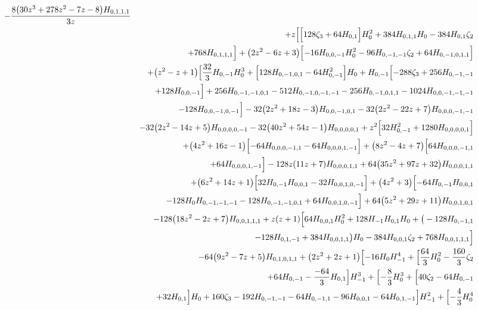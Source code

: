 \begin{eqnarray}
-\frac{8 \big(30 z^3+278  z^2-7 z-8\big) H_{0,1,1,1}}{3 z}
\nonumber \\ &&
+z \Bigl[\Bigl[128  \zeta_3+64 H_{0,1}\Bigr] H_0^2+384  H_{0,1,1} H_0-384  H_{0,1}\zeta_2
\nonumber \\ &&
+768  H_{0,1,1,1}\Bigr]+\big(2 z^2-6 z+3\big) \Bigl[-16H_{0,0,-1} H_0^2-96 H_{0,-1,-1} \zeta_2+64 H_{0,-1,0,1,1}\Bigr]
\nonumber \\ &&
+\big(z^2-z+1\big) \Bigl[\frac{32}{3} H_{0,-1}H_0^3+\Bigl[128  H_{0,-1,0,1}-64 H_{0,-1}^2\Bigr] H_0+H_{0,-1} \Bigl[-288 \zeta_3
+256 H_{0,-1,-1}
\nonumber \\ &&
+128 H_{0,0,-1}\Bigr]+256 H_{0,-1,-1,0,1}-512 H_{0,-1,0,-1,-1}-256 H_{0,-1,0,1,1}-1024H_{0,0,-1,-1,-1}
\nonumber \\ &&
-128 H_{0,0,-1,0,-1}\Bigr]-32 \big(2 z^2+18 z-3\big)H_{0,0,-1,0,1}-32 \big(2 z^2-22 z+7\big) H_{0,0,0,-1,-1}
\nonumber \\ &&
-32 \big(2 z^2-14z+5\big) H_{0,0,0,0,-1}-32 \big(40 z^2+54 z-1\big) H_{0,0,0,0,1}+z^2 \Bigl[32H_{0,-1}^2+1280  H_{0,0,0,0,1}\Bigr]
\nonumber \\ &&
+\big(4 z^2+16 z-1\big) \Bigl[-64H_{0,0,0,-1,1}-64 H_{0,0,0,1,-1}\Bigr]+\big(8 z^2-4 z+7\big) \Bigl[64 H_{0,0,0,-1,1}
\nonumber \\ &&
+64  H_{0,0,0,1,-1}\Bigr]-128  z (11 z+7)H_{0,0,0,1,1}+64 \big(35 z^2+97 z+32\big) H_{0,0,0,1,1}
\nonumber \\ &&
+\big(6 z^2+14 z+1\big)\Bigl[32 H_{0,-1} H_{0,0,1}-32 H_{0,0,1,0,-1}\Bigr]+\big(4 z^2+3\big) \Bigl[-64 H_{0,-1} H_{0,0,1}
\nonumber \\ &&
-128 H_0 H_{0,-1,-1,-1}-128  H_{0,-1,-1,0,1}+64 H_{0,0,1,0,-1}\Bigr]+64 \big(5 z^2+29 z+11\big) H_{0,0,1,0,1}
\nonumber \\ &&
-128\big(18 z^2-2 z+7\big) H_{0,0,1,1,1}+z (z+1) \Bigl[64  H_{0,0,1}H_0^2+128 H_{-1} H_{0,1} H_0+\big(-128 H_{0,-1,1}
\nonumber \\ &&
-128 H_{0,1,-1}+384 H_{0,0,1,1}\big) H_0-384  H_{0,0,1} \zeta_2+768 H_{0,0,1,1,1}\Bigr]
\nonumber \\ &&
-64 \big(9 z^2-7 z+5\big) H_{0,1,0,1,1}+\big(2 z^2+2z+1\big) \Bigl[-16 H_0 H_{-1}^4+\Bigl[\frac{64}{3} H_0^2-\frac{160}{3} \zeta_2
\nonumber \\ &&
+64 H_{0,-1}-\frac{-64}{3}H_{0,1}\Bigr] H_{-1}^3+\Bigl[-\frac{8}{3} H_0^3+\Bigl[40\zeta_2-64 H_{0,-1}
\nonumber \\ &&
+32 H_{0,1}\Bigr] H_0+160 \zeta_3-192 H_{0,-1,-1}-64H_{0,-1,1}
-96  H_{0,0,1}-64 H_{0,1,-1}\Bigr] H_{-1}^2+\Bigl[-\frac{4}{3} H_0^4

\end{eqnarray}
